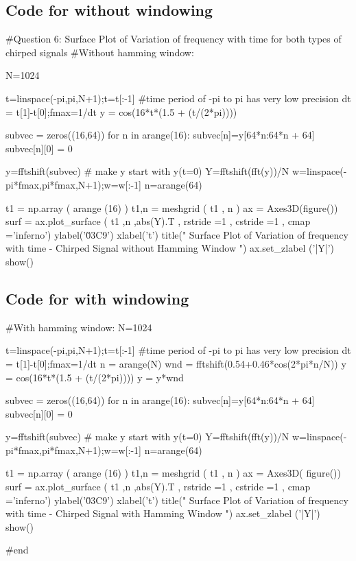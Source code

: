 \documentclass[11pt]{article}
\begin{document}
\subsection{Code for without windowing}
\begin{python}
#Question 6: Surface Plot of Variation of frequency with time for both types of chirped signals
#Without hamming window:

N=1024

t=linspace(-pi,pi,N+1);t=t[:-1] #time period of -pi to pi has very low precision
dt = t[1]-t[0];fmax=1/dt
y = cos(16*t*(1.5 + (t/(2*pi))))

subvec = zeros((16,64))
for n in arange(16):
    subvec[n]=y[64*n:64*n + 64]
    subvec[n][0] = 0

y=fftshift(subvec) # make y start with y(t=0)
Y=fftshift(fft(y))/N
w=linspace(-pi*fmax,pi*fmax,N+1);w=w[:-1]
n=arange(64)


t1 = np.array ( arange (16) )
t1,n = meshgrid ( t1 , n )
ax = Axes3D(figure())
surf = ax.plot_surface ( t1 ,n ,abs(Y).T , rstride =1 , cstride =1 , cmap ='inferno')
ylabel('\u03C9')
xlabel('t')
title(" Surface Plot of Variation of frequency with time - Chirped Signal without Hamming Window ")
ax.set_zlabel ('|Y|')
show()
\end{python}

\subsection{Code for with windowing}
\begin{python}
#With hamming window:
N=1024

t=linspace(-pi,pi,N+1);t=t[:-1] #time period of -pi to pi has very low precision
dt = t[1]-t[0];fmax=1/dt
n = arange(N)
wnd = fftshift(0.54+0.46*cos(2*pi*n/N))
y = cos(16*t*(1.5 + (t/(2*pi))))
y = y*wnd

subvec = zeros((16,64))
for n in arange(16):
    subvec[n]=y[64*n:64*n + 64]
    subvec[n][0] = 0


y=fftshift(subvec) # make y start with y(t=0)
Y=fftshift(fft(y))/N
w=linspace(-pi*fmax,pi*fmax,N+1);w=w[:-1]
n=arange(64)


t1 = np.array ( arange (16) )
t1,n = meshgrid ( t1 , n )
ax = Axes3D( figure())
surf = ax.plot_surface ( t1 ,n ,abs(Y).T , rstride =1 , cstride =1 , cmap ='inferno')
ylabel('\u03C9')
xlabel('t')
title(" Surface Plot of Variation of frequency with time - Chirped Signal with Hamming Window ")
ax.set_zlabel ('|Y|')
show()

#end
\end{python}
\end{document}
